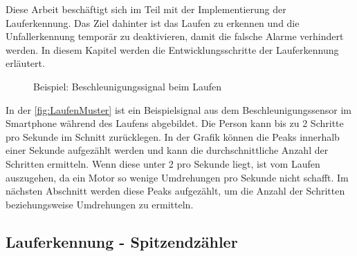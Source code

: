 Diese Arbeit beschäftigt sich im Teil mit der Implementierung der Lauferkennung. Das Ziel dahinter ist das Laufen zu erkennen und die Unfallerkennung temporär zu deaktivieren, damit die falsche Alarme verhindert werden.
In diesem Kapitel werden die Entwicklungsschritte der Lauferkennung erläutert.

%

\begin{figure}[H]
	\centering
	\caption{Beispiel: Beschleunigungssignal beim Laufen}
	\label{fig:LaufenMuster}
\end{figure}
In der \autoref{fig:LaufenMuster} ist ein Beispielsignal aus dem Beschleunigungssensor im Smartphone während des Laufens abgebildet. Die Person kann bis zu 2 Schritte pro Sekunde im Schnitt zurücklegen. In der Grafik können die Peaks innerhalb einer Sekunde aufgezählt werden und kann die durchschnittliche Anzahl der Schritten ermitteln. Wenn diese unter 2 pro Sekunde liegt, ist vom Laufen auszugehen, da ein Motor so wenige Umdrehungen pro Sekunde nicht schafft. Im nächsten Abschnitt werden diese Peaks aufgezählt, um die Anzahl der Schritten beziehungsweise Umdrehungen zu ermitteln.
%
\subsection{Lauferkennung - Spitzendzähler} \label{abs:PeaksAufzaehlen} %

